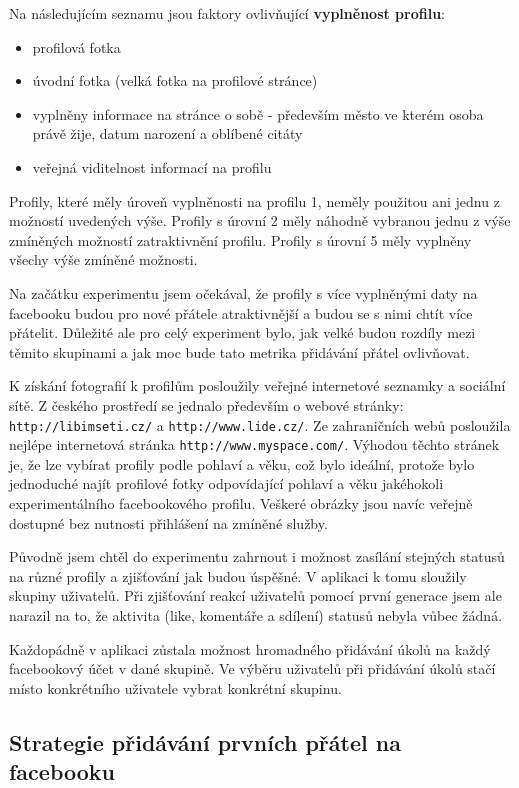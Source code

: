 \documentclass[thesis=M,czech]{FITthesis}[2013/05/10]
\begin{document}
Na následujícím seznamu jsou faktory ovlivňující \textbf{vyplněnost profilu}:

\begin{itemize}
  \item profilová fotka
  \item úvodní fotka (velká fotka na profilové stránce)
  \item vyplněny informace na stránce o sobě - především město ve kterém osoba právě žije, datum narození a oblíbené citáty
  \item veřejná viditelnost informací na profilu
\end{itemize}

Profily, které měly úroveň vyplněnosti na profilu 1, neměly použitou ani jednu z možností uvedených výše. Profily s úrovní 2 měly náhodně vybranou jednu z výše zmíněných možností zatraktivnění profilu. Profily s úrovní 5 měly vyplněny všechy výše zmíněné možnosti.

Na začátku experimentu jsem očekával, že profily s více vyplněnými daty na facebooku budou pro nové přátele atraktivnější a budou se s nimi chtít více přátelit. Důležité ale pro celý experiment bylo, jak velké budou rozdíly mezi těmito skupinami a jak moc bude tato metrika přidávání přátel ovlivňovat.

K získání fotografií k profilům posloužily veřejné internetové seznamky a sociální sítě. Z českého prostředí se jednalo především o webové stránky: \verb|http://libimseti.cz/| a \verb|http://www.lide.cz/|. Ze zahraničních webů posloužila nejlépe internetová stránka \verb|http://www.myspace.com/|. Výhodou těchto stránek je, že lze vybírat profily podle pohlaví a věku, což bylo ideální, protože bylo jednoduché najít profilové fotky odpovídající pohlaví a věku jakéhokoli experimentálního facebookového profilu. Veškeré obrázky jsou navíc veřejně dostupné bez nutnosti přihlášení na zmíněné služby.

Původně jsem chtěl do experimentu zahrnout i možnost zasílání stejných statusů na různé profily a zjišťování jak budou úspěšné. V aplikaci k tomu sloužily skupiny uživatelů. Při zjišťování reakcí uživatelů pomocí první generace jsem ale narazil na to, že aktivita (like, komentáře a sdílení) statusů nebyla vůbec žádná. 

Každopádně v aplikaci zůstala možnost hromadného přidávání úkolů na každý facebookový účet v dané skupině. Ve výběru uživatelů při přidávání úkolů stačí místo konkrétního uživatele vybrat konkrétní skupinu.

\subsection{Strategie přidávání prvních přátel na facebooku}
\end{document}
